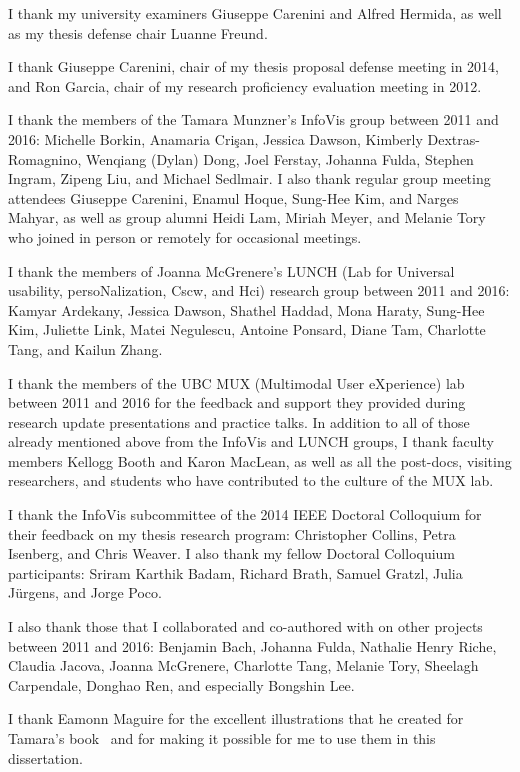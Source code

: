 I thank my university examiners Giuseppe Carenini and Alfred Hermida, as well as my thesis defense chair Luanne Freund.

I thank Giuseppe Carenini, chair of my thesis proposal defense meeting in 2014, and Ron Garcia, chair of my research proficiency evaluation meeting in 2012.

I thank the members of the Tamara Munzner's InfoVis group between 2011 and 2016: Michelle Borkin, Anamaria Cri\c{s}an, Jessica Dawson, Kimberly Dextras-Romagnino, Wenqiang (Dylan) Dong, Joel Ferstay, Johanna Fulda, Stephen Ingram, Zipeng Liu, and Michael Sedlmair. 
I also thank regular group meeting attendees Giuseppe Carenini, Enamul Hoque, Sung-Hee Kim, and Narges Mahyar, as well as group alumni Heidi Lam, Miriah Meyer, and Melanie Tory who joined in person or remotely for occasional meetings.

I thank the members of Joanna McGrenere's LUNCH (Lab for Universal usability, persoNalization, {\sc Cscw}, and {\sc Hci}) research group between 2011 and 2016: Kamyar Ardekany, Jessica Dawson, Shathel Haddad, Mona Haraty, Sung-Hee Kim, Juliette Link, Matei Negulescu, Antoine Ponsard, Diane Tam, Charlotte Tang, and Kailun Zhang.

I thank the members of the UBC MUX (Multimodal User eXperience) lab between 2011 and 2016 for the feedback and support they provided during research update presentations and practice talks. 
In addition to all of those already mentioned above from the InfoVis and LUNCH groups, I thank faculty members Kellogg Booth and Karon MacLean, as well as all the post-docs, visiting researchers, and students who have contributed to the culture of the MUX lab.

I thank the InfoVis subcommittee of the 2014 IEEE Doctoral Colloquium for their feedback on my thesis research program: Christopher Collins, Petra Isenberg, and Chris Weaver. 
I also thank my fellow Doctoral Colloquium participants: Sriram Karthik Badam, Richard Brath, Samuel Gratzl, Julia J\"urgens, and Jorge Poco.

I also thank those that I collaborated and co-authored with on other projects between 2011 and 2016: Benjamin Bach, Johanna Fulda, Nathalie Henry Riche, Claudia Jacova, Joanna McGrenere, Charlotte Tang, Melanie Tory, Sheelagh Carpendale, Donghao Ren, and especially Bongshin Lee.

I thank Eamonn Maguire for the excellent illustrations that he created for Tamara's book~\cite{Munzner2014} and for making it possible for me to use them in this dissertation.

